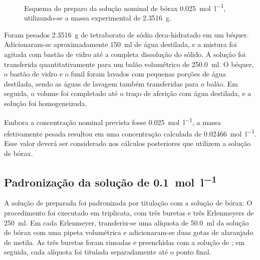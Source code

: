 \documentclass[a4paper,12pt]{article}
\begin{document}
\begin{figure}[H]
{%
}
\caption{Esquema do preparo da solução nominal de bórax \qty{0.025}{\mole\per\litre}, utilizando-se a massa experimental de \qty{2.3516}{\gram}.}
\label{fig:preparo_borax}
\end{figure}

Foram pesados \qty{2.3516}{\gram} de tetraborato de sódio deca-hidratado em um béquer. Adicionaram-se aproximadamente \qty{150}{\milli\litre} de água destilada, e a mistura foi agitada com bastão de vidro até a completa dissolução do sólido. A solução foi transferida quantitativamente para um balão volumétrico de \qty{250.0}{\milli\litre}. O béquer, o bastão de vidro e o funil foram lavados com pequenas porções de água destilada, sendo as águas de lavagem também transferidas para o balão. Em seguida, o volume foi completado até o traço de aferição com água destilada, e a solução foi homogeneizada.

\begin{tcolorbox}[
  title=Concentração da solução preparada,
  colback=quadrocinza,
  colframe=black!65,
  boxrule=0.6pt,
  arc=1mm
]
Embora a concentração nominal prevista fosse \qty{0.025}{\mole\per\litre}, a massa efetivamente pesada resultou em uma concentração calculada de \qty{0.02466}{\mole\per\litre}. Esse valor deverá ser considerado nos cálculos posteriores que utilizem a solução de bórax.
\end{tcolorbox}

\subsection{Padronização da solução de  \qty{0.1}{\mole\per\litre}}

A solução de  preparada foi padronizada por titulação com a solução de bórax. O procedimento foi executado em triplicata, com três buretas e três Erlenmeyers de \qty{250}{\milli\litre}. Em cada Erlenmeyer, transferiu-se uma alíquota de \qty{50.0}{\milli\litre} da solução de bórax com uma pipeta volumétrica e adicionaram-se duas gotas de alaranjado de metila. As três buretas foram rinsadas e preenchidas com a solução de ; em seguida, cada alíquota foi titulada separadamente até o ponto final.
\end{document}
